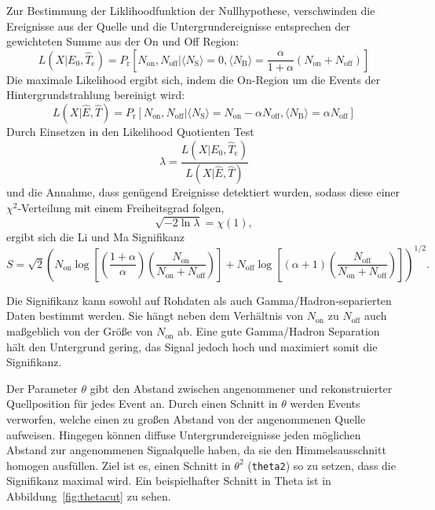 Zur Bestimmung der Liklihoodfunktion der Nullhypothese,
verschwinden die
Ereignisse aus der Quelle und die Untergrundereignisse entsprechen der
gewichteten Summe aus der On und Off Region:
\begin{equation}
	L(X|E_0, \hat{T}_\text{c})= P_\text{r} \left[
		N_\text{on}, N_\text{off} |
		\langle N_\text{S} \rangle = 0,
		\langle N_\text{B} \rangle = \frac{\alpha}{1 + \alpha} (N_\text{on} +
			N_\text{off})
	\right]
\end{equation}
Die maximale Likelihood ergibt sich, indem die On-Region
um die Events der Hintergrundstrahlung bereinigt wird:
\begin{equation}
	L(X|\hat{E}, \hat{T})= P_\text{r} \left[
		N_\text{on}, N_\text{off} |
		\langle N_\text{S} \rangle = N_\text{on} - \alpha N_\text{off},
		\langle N_\text{B} \rangle = \alpha N_\text{off}
	\right]
\end{equation}
Durch Einsetzen in den Likelihood Quotienten Test
\begin{equation}
	\lambda = \frac{L(X|E_0, \hat{T}_\text{c})}{L(X|\hat{E}, \hat{T})}
\end{equation}
und die Annahme, dass genügend Ereignisse detektiert wurden, sodass diese einer
$\chi^2$-Verteilung mit einem Freiheitsgrad folgen,
\begin{equation}
	\sqrt{- 2 \ln \lambda} = \chi(1),
\end{equation}
ergibt sich die Li und Ma Signifikanz
\begin{equation}
  S = \sqrt{2} {\left(
      N_\text{on} \log \left[
        \left( \frac{1 + \alpha}{\alpha} \right) \left(
          \frac{N_\text{on}}{N_\text{on} + N_\text{off}}
        \right)
      \right]
      + N_\text{off} \log \left[
        (\alpha + 1) \left(
          \frac{N_\text{off}}{N_\text{on} + N_\text{off}}
        \right)
      \right]
  \right)} ^ {1/2}.
\end{equation}

Die Signifikanz kann sowohl auf Rohdaten als auch Gamma/Hadron-separierten Daten
bestimmt werden.
Sie hängt neben dem Verhältnis von $N_\text{on}$ zu $N_\text{off}$ auch
maßgeblich von der Größe von $N_\text{on}$ ab.
Eine gute Gamma/Hadron Separation hält den Untergrund gering,
das Signal jedoch hoch
und maximiert somit die Signifikanz.

Der Parameter $\theta$ gibt den Abstand zwischen
angenommener und rekonstruierter Quellposition
für jedes Event an.
Durch einen Schnitt in $\theta$ werden Events verworfen,
welche einen zu großen Abstand von der angenommenen Quelle aufweisen.
Hingegen können diffuse Untergrundereignisse jeden möglichen Abstand zur
angenommenen Signalquelle haben,
da sie den Himmelsausschnitt homogen ausfüllen.
Ziel ist es, einen Schnitt in $\theta^2$ (\texttt{theta2}) so zu setzen,
dass die Signifikanz maximal wird.
Ein beispielhafter Schnitt in Theta ist in
Abbildung~\ref{fig:thetacut} zu sehen.

